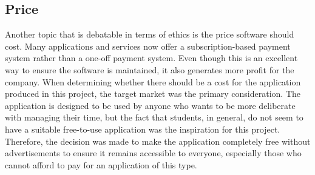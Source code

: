	    \subsection{Price}
	    Another topic that is debatable in terms of ethics is the price software should cost.  Many applications and services now offer a subscription-based payment system rather than a one-off payment system. Even though this is an excellent way to ensure the software is maintained, it also generates more profit for the company.  When determining whether there should be a cost for the application produced in this project, the target market was the primary consideration.  The application is designed to be used by anyone who wants to be more deliberate with managing their time, but the fact that students, in general, do not seem to have a suitable free-to-use application was the inspiration for this project.  Therefore, the decision was made to make the application completely free without advertisements to ensure it remains accessible to everyone, especially those who cannot afford to pay for an application of this type.